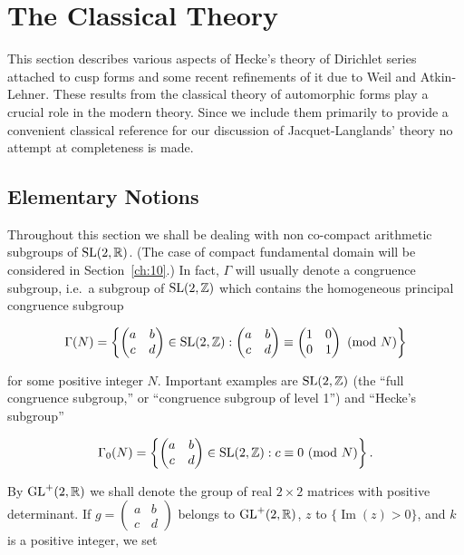 \chapter{The Classical Theory}

\label{ch:1}

This section describes various aspects of Hecke's theory of Dirichlet series attached to cusp forms and some recent refinements of it due to Weil and Atkin-Lehner. These results from the classical theory of automorphic forms play a crucial role in the modern theory. Since we include them primarily to provide a convenient classical reference for our discussion of Jacquet-Langlands' theory no attempt at completeness is made.

\section{Elementary Notions}\label{sec:1a}

Throughout this section we shall be dealing with non co-compact arithmetic subgroups of $\operatorname{SL}(2,\mathbb{R})$. (The case of compact fundamental domain will be considered in Section~\ref{ch:10}.) In fact, $\Gamma$ will usually denote a congruence subgroup, i.e.\ a subgroup of $\operatorname{SL}(2,\mathbb{Z})$ which contains the homogeneous principal congruence subgroup

\[
\Gamma(N) = \left\{\begin{pmatrix} a & b \\ c & d \end{pmatrix} \in \operatorname{SL}(2,\mathbb{Z}): \begin{pmatrix} a & b \\ c & d \end{pmatrix} \equiv \begin{pmatrix} 1 & 0 \\ 0 & 1 \end{pmatrix} \ (\mathrm{mod}\ N)\right\}
\]

for some positive integer $N$. Important examples are $\operatorname{SL}(2,\mathbb{Z})$ (the ``full congruence subgroup,'' or ``congruence subgroup of level 1'') and ``Hecke's subgroup''

\[
\Gamma_0(N) = \left\{\begin{pmatrix} a & b \\ c & d \end{pmatrix} \in \SL(2,\Z): c \equiv 0 \ (\mathrm{mod}\ N)\right\}.
\]

By $\operatorname{GL}^+(2,\mathbb{R})$ we shall denote the group of real $2 \times 2$ matrices with positive determinant. If $g = \begin{pmatrix} a & b \\ c & d \end{pmatrix}$ belongs to $\operatorname{GL}^+(2,\mathbb{R})$, $z$ to $\{\operatorname{Im}(z) > 0\}$, and $k$ is a positive integer, we set

